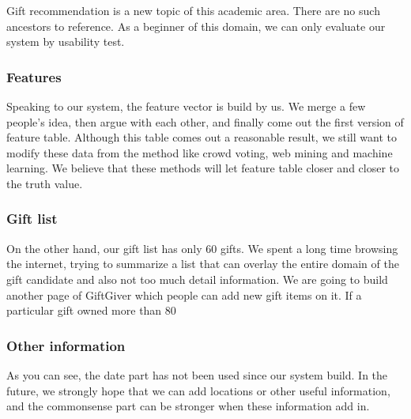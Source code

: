 \documentclass[11pt,twocolumn]{article}
\begin{document}
Gift recommendation is a new topic of this academic area.   There are no such ancestors to reference.   As a beginner of this domain, we can only evaluate our system by usability test. 

\subsubsection{Features}
Speaking to our system, the feature vector is build by us.   We merge a few people’s idea, then argue with each other, and finally come out the first version of feature table.
Although this table comes out a reasonable result, we still want to modify these data from the method like crowd voting, web mining and machine learning.   We believe that these methods will let feature table closer and closer to the truth value.

\subsubsection{Gift list}
On the other hand, our gift list has only 60 gifts.   We spent a long time browsing the internet, trying to summarize a list that can overlay the entire domain of the gift candidate and also not too much detail information.   We are going to build another page of GiftGiver which people can add new gift items on it.   If a particular gift owned more than 80%

\subsubsection{Other information}
As you can see, the date part has not been used since our system build. In the future, we strongly hope that we can add locations or other useful information, and the commonsense part can be stronger when these information add in.


\newpage


\end{document}
